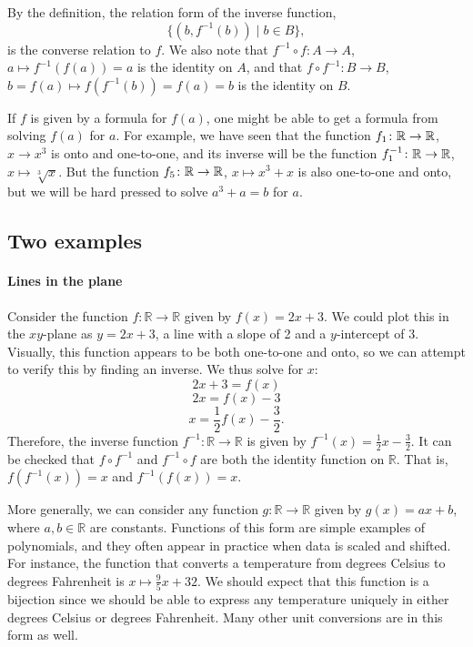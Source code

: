 By the definition, the relation form of the inverse function,
\[
\{(b,f^{-1}(b))\mid b\in B\},
\]
is the converse relation to $f$. We also
note that $f^{-1}\circ f\colon A\to A$, $a\mapsto f^{-1}(f(a))=a$ is the identity
on $A$, and that $f\circ f^{-1}\colon B\to B$, $b=f(a)\mapsto f(f^{-1}(b))=f(a)=b$ is
the identity on $B$.
\medskip

If $f$ is given by a formula for $f(a)$, one might be able to get a formula  from
solving $f(a)$ for $a$. For example, we have seen that the function $f_1\colon{\mathbb R}\to{\mathbb R}$,
$x\to x^3$ is onto and one-to-one, and its inverse will be the function
$f_1^{-1}\colon{\mathbb R}\to{\mathbb R}$, $x\mapsto\sqrt[3]{x}$. But the function $f_5\colon{\mathbb R}\to{\mathbb R}$,
$x\mapsto x^3+x$ is also one-to-one and  onto, but we will be hard pressed to solve
$a^3+a=b$ for $a$.

\subsection{Two examples}

\paragraph{Lines in the plane}
Consider the function $f \colon \mathbb{R} \to \mathbb{R}$ given by $f(x) = 2x+3$.
We could plot this in the $xy$-plane as $y=2x+3$, a line with a slope of 2 and a $y$-intercept of 3.
Visually, this function appears to be both one-to-one and onto, so we can attempt to verify this by finding an inverse.
We thus solve for $x$:
\[
2x+3 = f(x)
\]
\[
2x = f(x)-3
\]
\[
x = \frac{1}{2}f(x) - \frac{3}{2}.
\]
Therefore, the inverse function $f^{-1} \colon \mathbb{R} \to \mathbb{R}$ is given by $f^{-1}(x) = \frac{1}{2}x - \frac{3}{2}$.
It can be checked that $f \circ f^{-1}$ and $f^{-1} \circ f$ are both the identity function on $\mathbb{R}$.  That is, $f(f^{-1}(x)) = x$ and $f^{-1}(f(x))=x$.

More generally, we can consider any function $g \colon \mathbb{R} \to \mathbb{R}$ given by $g(x) = ax+b$, where $a,b \in \mathbb{R}$ are constants.  
Functions of this form are simple examples of polynomials, and they often appear in practice when data is scaled and shifted.
For instance, the function that converts a temperature from degrees Celsius to degrees Fahrenheit is $x \mapsto \frac{9}{5} x + 32$.
We should expect that this function is a bijection since we should be able to express any temperature uniquely in either degrees Celsius or degrees Fahrenheit.
Many other unit conversions are in this form as well.

